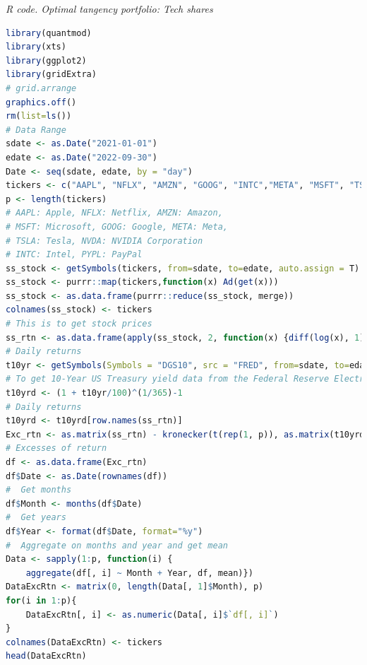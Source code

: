 \begin{enumerate}
\begin{tcolorbox}[enhanced,width=4.67in,center upper,
	fontupper=\large\bfseries,drop shadow southwest,sharp corners]
	\textit{R code. Optimal tangency portfolio: Tech shares}
\begin{VF}
\begin{lstlisting}[language=R]
library(quantmod)
library(xts)
library(ggplot2)
library(gridExtra) 
# grid.arrange
graphics.off()
rm(list=ls())
# Data Range
sdate <- as.Date("2021-01-01")
edate <- as.Date("2022-09-30")
Date <- seq(sdate, edate, by = "day")
tickers <- c("AAPL", "NFLX", "AMZN", "GOOG", "INTC","META", "MSFT", "TSLA", "NVDA", "PYPL")
p <- length(tickers)
# AAPL: Apple, NFLX: Netflix, AMZN: Amazon, 
# MSFT: Microsoft, GOOG: Google, META: Meta,
# TSLA: Tesla, NVDA: NVIDIA Corporation
# INTC: Intel, PYPL: PayPal 
ss_stock <- getSymbols(tickers, from=sdate, to=edate, auto.assign = T)
ss_stock <- purrr::map(tickers,function(x) Ad(get(x)))
ss_stock <- as.data.frame(purrr::reduce(ss_stock, merge))
colnames(ss_stock) <- tickers
# This is to get stock prices
ss_rtn <- as.data.frame(apply(ss_stock, 2, function(x) {diff(log(x), 1)}))
# Daily returns
t10yr <- getSymbols(Symbols = "DGS10", src = "FRED", from=sdate, to=edate, auto.assign = F)
# To get 10-Year US Treasury yield data from the Federal Reserve Electronic Database (FRED)
t10yrd <- (1 + t10yr/100)^(1/365)-1 
# Daily returns
t10yrd <- t10yrd[row.names(ss_rtn)]
Exc_rtn <- as.matrix(ss_rtn) - kronecker(t(rep(1, p)), as.matrix(t10yrd))
# Excesses of return
df <- as.data.frame(Exc_rtn)
df$Date <- as.Date(rownames(df))
#  Get months
df$Month <- months(df$Date)
#  Get years
df$Year <- format(df$Date, format="%y")
#  Aggregate on months and year and get mean
Data <- sapply(1:p, function(i) {
	aggregate(df[, i] ~ Month + Year, df, mean)})
DataExcRtn <- matrix(0, length(Data[, 1]$Month), p)
for(i in 1:p){
	DataExcRtn[, i] <- as.numeric(Data[, i]$`df[, i]`)
}
colnames(DataExcRtn) <- tickers
head(DataExcRtn)
\end{lstlisting}
\end{VF}
\end{tcolorbox}
     

\end{enumerate}
